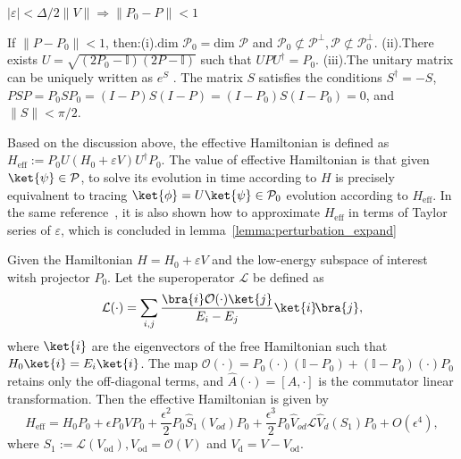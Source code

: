 \begin{lemma}\label{lemma:P=P_0}
    $|\varepsilon| < \Delta/2\|V\| \Rightarrow \|P_0 - P\| <1$
\end{lemma}
\begin{lemma}
    \label{lemma:P=P_02}
    If $\|{P} - {P}_0\| <1$, then:(i).$\text{dim~}\mathcal{P}_0 =\text{dim~}\mathcal{P}$ and $\mathcal{P}_0 \not\subset \mathcal{P}^\perp,\mathcal{P}\not\subset\mathcal{P}_0^\perp$. (ii).There exists $U = \sqrt{(2P_0-\mathbb{I})(2P-\mathbb{I})}$ such that $UPU^\dagger = P_0$. (iii).The unitary matrix can be uniquely written as $e^{S}$ . The matrix $S$ satisfies the conditions $S^\dagger = -S$,$PSP = P_0SP_0 = (I − P )S(I − P ) = (I − P_0)S(I − P_0) = 0$, and $\|S\| < \pi/2$.
\end{lemma}
Based on the discussion above, the effective Hamiltonian is defined as $H_{\mathrm{eff}} := P_0U(H_0 + \varepsilon V)U^\dagger P_0$. 
The value of effective Hamiltonian is that given $\ket{\psi} \in \mathcal{P}$, to solve its evolution in time according to $H$ 
is precisely equivalnent to tracing $\ket{\phi} =U\ket{\psi} \in \mathcal{P}_0$ evolution according to  $H_{\mathrm{eff}}$.
In the same reference~\cite{bravyi2011schrieffer}, it is also shown how to approximate $H_{\mathrm{eff}}$ in terms of Taylor series of $\varepsilon$, which is concluded in lemma~\ref{lemma:perturbation_expand}
\begin{lemma}\label{lemma:perturbation_expand}
Given the Hamiltonian $H = H_0 + \varepsilon V$ and the low-energy subspace of interest witsh projector $P_0$. Let the superoperator $\mathcal{L}$ be defined as
\begin{equation}
    \mathcal{L}(\cdot) = \sum_{i,j} \frac{\bra{i} \mathcal{O}(\cdot) \ket{j}}{E_i - E_j} \ket{i}\!\bra{j},
\end{equation}
where $\ket{i}$ are the eigenvectors of the free Hamiltonian such that $H_0\ket{i} = E_i \ket{i}$. The map $\mathcal{O}(\cdot) = P_0 (\cdot)(\mathbb{I}-P_0) + (\mathbb{I}-P_0)(\cdot)P_0$ retains only the off-diagonal terms, and $\hat{A}(\cdot) = [A, \cdot]$ is the commutator linear transformation. Then the effective Hamiltonian is given by
\begin{equation}
    H_{\mathrm{eff}} = H_0 P_0 + \epsilon P_0 V P_0 + \frac{\epsilon^2}{2} P_0 \hat{S}_1(V_{od}) P_0 + \frac{\epsilon^3}{2} P_0 \hat{V}_{od} \mathcal{L} \hat{V}_d(S_1) P_0 + O(\epsilon^4),
\end{equation}
where $S_1 := \mathcal{L}(V_{\mathrm{od}}), V_{\mathrm{od}} = \mathcal{O}(V)$ and $V_{\mathrm{d}} = V - V_{\mathrm{od}}$. 
\end{lemma}
